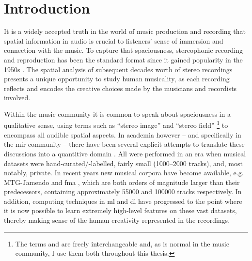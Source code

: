 \chapter{Introduction}
\label{sec:intro}

It is a widely accepted truth in the world of music production and recording that spatial information in audio is crucial to  listeners' sense of immersion and connection with the music. To capture that spaciousness, stereophonic recording and reproduction has been the standard format since it gained popularity in the 1950s \cite{zagorski-thomasBloomsburyHandbookMusic2020,lanierHIFITWOCHANNELCOMMOTION1957}. The spatial analysis of subsequent decades worth of stereo recordings presents a unique opportunity to study human musicality, as each recording reflects and encodes the creative choices made by the musicians and recordists involved.

Within the music community it is common to speak about spaciousness in a qualitative sense, using terms such as \enquote{stereo image} and \enquote{stereo field} \footnote{The terms  and  are freely interchangeable and, as is normal in the music community, I use them both throughout this thesis.} to encompass all audible spatial aspects. In academia however -- and specifically in the \gls{mir} community -- there have been several explicit attempts to translate these discussions into a quantitive domain \cite{tzanetakisStereoPanningFeatures2007,sarroffMeasurementsSpaciousnessStereophonic2008,tardieuProductionEffectAudio2011}. All were performed in an era when musical datasets were \mbox{hand-curated/-labelled}, fairly small (\numrange{1000}{2000} tracks), and, most notably, private. In recent years new musical corpora have become available, e.g. MTG-Jamendo \cite{bogdanovMTGJamendoDatasetAutomatic2019} and \gls{fma} \cite{defferrardFMADatasetMusic2017}, which are both orders of magnitude larger than their predecessors, containing approximately \num{55000} and \num{100000} tracks respectively. In addition, computing techniques in \gls{ml} and \gls{dl} have progressed to the point where it is now possible to learn extremely high-level features on these vast datasets, thereby making sense of the human creativity represented in the recordings. 

